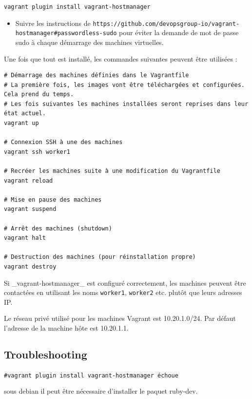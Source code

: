 \documentclass[a4paper,oneside,10pt]{article}
\begin{document}
\begin{verbatim}
vagrant plugin install vagrant-hostmanager
\end{verbatim}

\begin{itemize}
\item Suivre les instructions de \texttt{https://github.com/devopsgroup-io/vagrant-hostmanager\#passwordless-sudo} pour éviter la demande de mot de passe sudo à chaque démarrage des machines virtuelles.
\end{itemize}
Une fois que tout est installé, les commandes suivantes peuvent être utilisées :

\begin{verbatim}
# Démarrage des machines définies dans le Vagrantfile
# La première fois, les images vont être téléchargées et configurées. Cela prend du temps.
# Les fois suivantes les machines installées seront reprises dans leur état actuel.
vagrant up

# Connexion SSH à une des machines
vagrant ssh worker1

# Recréer les machines suite à une modification du Vagrantfile
vagrant reload

# Mise en pause des machines
vagrant suspend

# Arrêt des machines (shutdown)
vagrant halt

# Destruction des machines (pour réinstallation propre)
vagrant destroy
\end{verbatim}

Si \_vagrant-hostmanager\_ est configuré correctement, les machines peuvent être contactées en utilisant les noms \verb!worker1!, \verb!worker2! etc. plutôt que leurs adresses IP.

Le réseau privé utilisé pour les machines Vagrant est 10.20.1.0/24. Par défaut l'adresse de la machine hôte est 10.20.1.1.

\subsection{Troubleshooting}

\verb!#vagrant plugin install vagrant-hostmanager échoue!

sous debian il peut être nécessaire d'installer le paquet ruby-dev.
\end{document}
